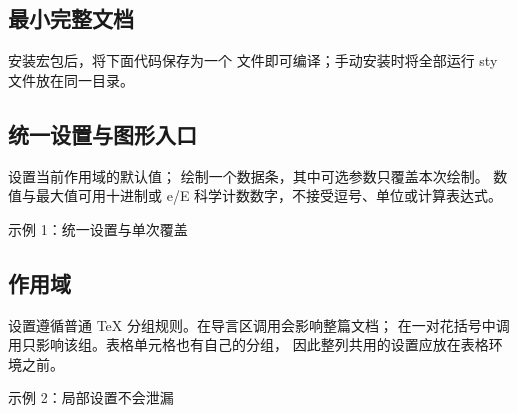 \subsection{最小完整文档}
安装宏包后，将下面代码保存为一个  文件即可编译；手动安装时将全部运行 sty 文件放在同一目录。

\subsection{统一设置与图形入口}
 设置当前作用域的默认值；
 绘制一个数据条，其中可选参数只覆盖本次绘制。
数值与最大值可用十进制或 e/E 科学计数数字，不接受逗号、单位或计算表达式。

\begin{example}{示例 1：统一设置与单次覆盖}


\end{example}

\subsection{作用域}
设置遵循普通 TeX 分组规则。在导言区调用会影响整篇文档；
在一对花括号中调用只影响该组。表格单元格也有自己的分组，
因此整列共用的设置应放在表格环境之前。

\begin{example}{示例 2：局部设置不会泄漏}
{
 }

\end{example}
